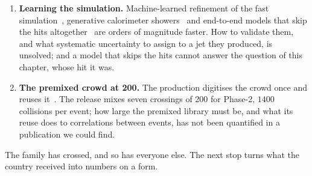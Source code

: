 \begin{enumerate}
    two~\cite{Johnson:2024qqt}, and the first integrations into experiment
    frameworks met difficulties~\cite{Apostolakis:2025vca}; the options of
    \GEANT~11 for faster electromagnetic physics are being
    adopted~\cite{Hahnfeld:2024zrb}.
  \item \textbf{Learning the simulation.} Machine-learned refinement of the
    fast simulation~\cite{Bein:2023ylt}, generative calorimeter
    showers~\cite{Amram:2023onf,Krause:2024avx} and end-to-end models that
    skip the hits altogether~\cite{Vaselli:2024vrx,Vaselli:2025fov} are
    orders of magnitude faster. How to validate them, and what systematic
    uncertainty to assign to a jet they produced, is unsolved; and a model
    that skips the hits cannot answer the question of this chapter, whose
    hit it was.
  \item \textbf{The premixed crowd at 200.} The production digitises the
    crowd once and reuses it~\cite{Hildreth:2017caz}. The release mixes
    seven crossings of $200$ for Phase-2, $1400$ collisions per event; how
    large the premixed library must be, and what its reuse does to
    correlations between events, has not been quantified in a publication we
    could find.
\end{enumerate}
The family has crossed, and so has everyone else. The next stop turns what
the country received into numbers on a form.
